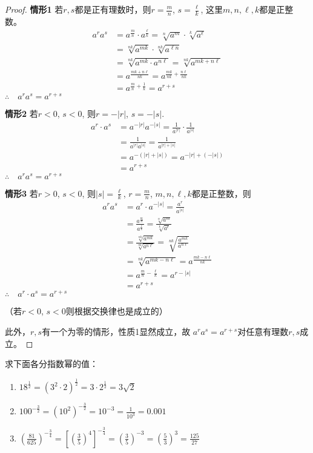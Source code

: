 \begin{proof}
\textbf{情形1 } 若$r,s$都是正有理数时，则$r=\frac{m}{n}$, $s=\frac{\ell}{k}$, 
这里$m,n,\ell,k$都是正整数。
\[\begin{split}
a^r a^s&= a^{\tfrac{m}{n}}\cdot a^{\tfrac{\ell}{k}} =\sqrt[n]{a^m}\cdot \sqrt[k]{a^{\ell}}\\
&=\sqrt[nk]{a^{mk}}\cdot \sqrt[nk]{a^{\ell n}}\\
&=\sqrt[nk]{a^{mk}\cdot a^{n\ell}}=\sqrt[nk]{a^{mk+n\ell}}\\
&=a^{\tfrac{mk+n\ell}{nk}}=a^{\tfrac{mk}{nk}+\tfrac{n\ell}{nk}}\\
&=a^{\tfrac{m}{n}+\tfrac{1}{k}}=a^{r+s}
\end{split}\]
$\therefore\quad a^r a^s=a^{r+s}$

\textbf{情形2 } 若$r<0$, $s<0$, 则$r=-|r|$, $s=-|s|$.
\[\begin{split}
a^r\cdot a^s &= a^{-|r|}a^{-|s|}=\frac{1}{a^{|r|}}\cdot \frac{1}{a^{|s|}}\\
&=\frac{1}{a^{|r|}a^{|s|}}=\frac{1}{a^{|r|+|s|}}\\
&=a^{-(|r|+|s|)}=a^{-|r|+(-|s|)}\\
&=a^{r+s}
\end{split}\]
$\therefore\quad a^r a^s=a^{r+s}$


\textbf{情形3 } 若$r>0$, $s<0$, 则$|s|=\frac{\ell}{k}$, $r=\frac{m}{n}$, 
$m,n,\ell,k$都是正整数，则
\[\begin{split}
a^r a^s&=a^r\cdot  a^{-|s|}=\frac{a^r}{a^{|s|}}\\
&=\frac{a^{\tfrac{m}{n}}}{a^{\tfrac{\ell}{k}}}=\frac{\sqrt[n]{a^m}}{\sqrt[k]{a^{\ell}}}\\
&=\frac{\sqrt[nk]{a^{mk}}}{\sqrt[nk]{a^{n\ell}}}=\sqrt[nk]{\frac{a^{mk}}{a^{n\ell}}}\\
&=\sqrt[nk]{a^{mk-n\ell}}=a^{\tfrac{mk-n\ell}{nk}}\\
&=a^{\tfrac{m}{n}-\tfrac{\ell}{k}}=a^{r-|s|}\\
&=a^{r+s}
\end{split}\]
$\therefore\quad a^r\cdot  a^s=a^{r+s}$

（若$r<0$, $s<0$则根据交换律也是成立的）

此外，$r,s$有一个为零的情形，性质1显然成立，故
$a^ra^s=a^{r+s}$对任意有理数$r,s$成立。
\end{proof}

\begin{example}
求下面各分指数幂的值：
\begin{enumerate}
\item $18^{\tfrac{1}{2}}=\left(3^2\cdot 2\right)^{\tfrac{1}{2}}=3\cdot 2^{\tfrac{1}{2}}=3\sqrt{2}$
\item $100^{-\tfrac{3}{2}}=(10^2)^{-\tfrac{3}{2}}=10^{-3}=\frac{1}{10^3}=0.001$
\item $\left(\frac{81}{625}\right)^{-\tfrac{3}{4}}=\left[\left(\frac{3}{5}\right)^4\right]^{-\tfrac{3}{4}}=\left(\frac{3}{5}\right)^{-3}=\left(\frac{5}{3}\right)^3=\frac{125}{27}$
\end{enumerate}
\end{example}
    
